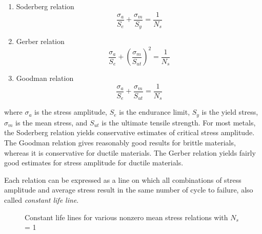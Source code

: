 \documentclass[
fontsize=10pt,
a4paper,
twosides=false,
open=any,
svgnames,
]{kaobook} %
\begin{document}
\begin{enumerate}
\item Soderberg relation
  \begin{equation}
    \frac{\sigma_a}{S_e} + \frac{\sigma _m}{S_y} = \frac{1}{N_s}
  \end{equation}
\item Gerber relation
  \begin{equation}
    \frac{\sigma_a}{S_e} + \left( \frac{\sigma_m}{S_{ut}} \right)^2 = \frac{1}{N_s}
  \end{equation}
\item Goodman relation
  \begin{equation}
    \frac{\sigma_a}{S_e} + \frac{\sigma _m}{S_{ut}} = \frac{1}{N_s}
  \end{equation}
\end{enumerate}

where $\sigma_a$ is the stress amplitude, $S_e$ is the endurance limit, $S_y$ is the yield stress, $\sigma_m$ is the mean stress, and $S_{ut}$ is the ultimate tensile strength. For most metals, the Soderberg relation yields conservative estimates of critical stress amplitude. The Goodman relation gives reasonably good results for brittle materials, whereas it is conservative for ductile materials. The Gerber relation yields fairly good estimates for stress amplitude for ductile materials.

Each relation can be expressed as a line on which all combinations of stress amplitude and average stress result in the same number of cycle to failure, also called \emph{constant life line}.

\begin{figure}[h]
  \centering
  \caption{Constant life lines for various nonzero mean stress relations with
    $N_s$ = 1}
  \label{fig: nonzero mean stress relations}
\end{figure}
\end{document}
